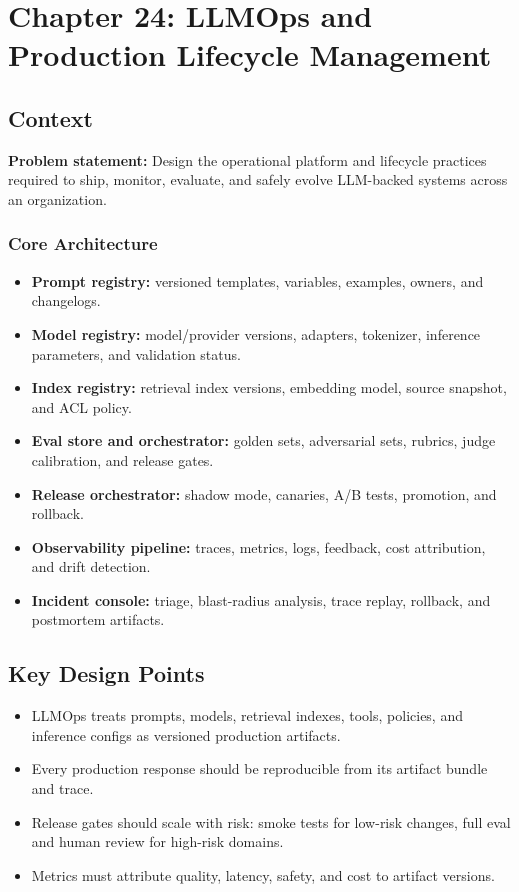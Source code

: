 \chapter{Chapter 24: LLMOps and Production Lifecycle Management}

\section*{Context}
\textbf{Problem statement:} Design the operational platform and lifecycle practices required to ship, monitor, evaluate, and safely evolve LLM-backed systems across an organization.

\subsection*{Core Architecture}
\begin{itemize}
  \item \textbf{Prompt registry:} versioned templates, variables, examples, owners, and changelogs.
  \item \textbf{Model registry:} model/provider versions, adapters, tokenizer, inference parameters, and validation status.
  \item \textbf{Index registry:} retrieval index versions, embedding model, source snapshot, and ACL policy.
  \item \textbf{Eval store and orchestrator:} golden sets, adversarial sets, rubrics, judge calibration, and release gates.
  \item \textbf{Release orchestrator:} shadow mode, canaries, A/B tests, promotion, and rollback.
  \item \textbf{Observability pipeline:} traces, metrics, logs, feedback, cost attribution, and drift detection.
  \item \textbf{Incident console:} triage, blast-radius analysis, trace replay, rollback, and postmortem artifacts.
\end{itemize}

\section*{Key Design Points}
\begin{itemize}
  \item LLMOps treats prompts, models, retrieval indexes, tools, policies, and inference configs as versioned production artifacts.
  \item Every production response should be reproducible from its artifact bundle and trace.
  \item Release gates should scale with risk: smoke tests for low-risk changes, full eval and human review for high-risk domains.
  \item Metrics must attribute quality, latency, safety, and cost to artifact versions.
\end{itemize}

